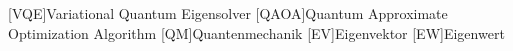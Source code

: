 \begin{acronym}
    [VQE]{Variational Quantum Eigensolver}
    [QAOA]{Quantum Approximate Optimization Algorithm}
    [QM]{Quantenmechanik}
    [EV]{Eigenvektor}
    [EW]{Eigenwert}
\end{acronym}